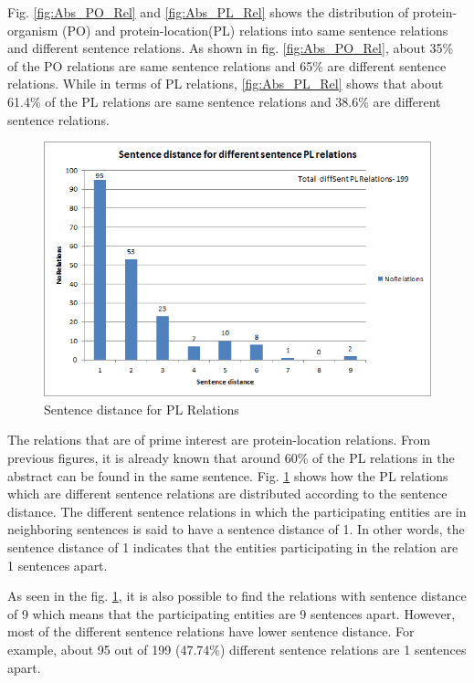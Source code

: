 Fig. \ref{fig:Abs_PO_Rel} and \ref{fig:Abs_PL_Rel} shows the distribution of protein-organism (PO) and protein-location(PL) relations into same sentence relations and different sentence relations. As shown in fig. \ref{fig:Abs_PO_Rel}, about 35\% of the PO relations are same sentence relations and 65\% are different sentence relations. While in terms of PL relations, \ref{fig:Abs_PL_Rel} shows that about 61.4\% of the PL relations are same sentence relations and 38.6\% are different sentence relations.

\begin{figure}
\centering
\includegraphics[scale=0.7]{figures/SentenceDistance_PLRel.png}
\caption{Sentence distance for PL Relations}\label{fig:SentDistancePL}
\end{figure}

The relations that are of prime interest are protein-location relations. From previous figures, it is already known that around 60\% of the PL relations in the abstract can be found in the same sentence. Fig. \ref{fig:SentDistancePL} shows how the PL relations which are different sentence relations are distributed according to the sentence distance. The different sentence relations in which the participating entities are in neighboring sentences is said to have a sentence distance of 1. In other words, the sentence distance of 1 indicates that the entities participating in the relation are 1 sentences apart. 

As seen in the fig. \ref{fig:SentDistancePL}, it is also possible to find the relations with sentence distance of 9 which means that the participating entities are 9 sentences apart. However, most of the different sentence relations have lower sentence distance. For example, about 95 out of 199 (47.74\%) different sentence relations are 1 sentences apart.

